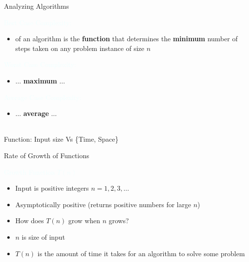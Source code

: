 \documentclass{beamer}
\newcommand{\tblue}[1]{{\Large {\textcolor{azure}{#1}}}}
\begin{document}
\begin{frame}{Analyzing Algorithms}

\tblue{Best Case Complexity:}
\begin{itemize}
\item of an algorithm is the {\bf function} that determines the {\bf minimum} number of steps taken on any problem instance of size $n$
\end{itemize}
\tblue{Worst Case Complexity:}
\begin{itemize}
\item $\ldots$ {\bf maximum} $\ldots$
\end{itemize}
\tblue{Average Case Complexity:}
\begin{itemize}
\item $\ldots$ {\bf average} $\ldots$
\end{itemize}
~\\
Function: Input size Vs \{Time, Space\}
\end{frame}

\begin{frame}{Rate of Growth of Functions}

\tblue{Growth Function $T(n)$}
\begin{itemize}
\item Input is positive integers $n=1,2,3, \ldots$
\item Asymptotically positive (returns positive numbers for large $n$)
\item How does $T(n)$ grow when $n$ grows?
\item $n$ is size of input
\item $T(n)$ is the amount of time it takes for an algorithm to solve some problem
\end{itemize}
\end{frame}
\end{document}
